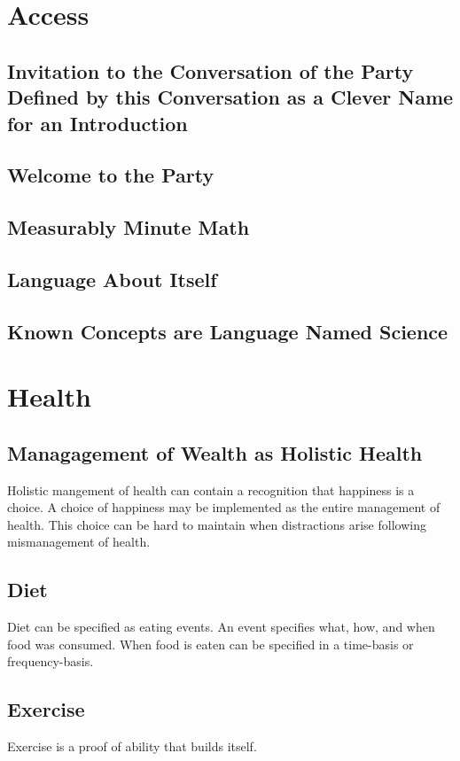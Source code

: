 
\tableofcontents

\part{Access}
\chapter{Invitation to the Conversation of the Party Defined by this Conversation as a Clever Name for an Introduction}

\chapter{Welcome to the Party}

\chapter{Measurably Minute Math}

\chapter{Language About Itself}

\chapter{Known Concepts are Language Named Science}

\part{Health}
\chapter{Managagement of Wealth as Holistic Health}
Holistic mangement of health can contain a recognition that happiness is a choice.
A choice of happiness may be implemented as the entire management of health.
This choice can be hard to maintain when distractions arise following mismanagement of health.

\chapter{Diet}
Diet can be specified as eating events.
An event specifies what, how, and when food was consumed.
When food is eaten can be specified in a time-basis or frequency-basis.

\chapter{Exercise}
Exercise is a proof of ability that builds itself.

